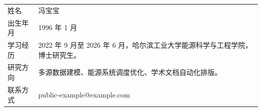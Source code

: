 \begin{tabularx}{\textwidth}{@{}lX@{}}
姓名 & 冯宝宝\\
出生年月 & 1996 年 1 月\\
学习经历 & 2022 年 9 月至 2026 年 6 月，哈尔滨工业大学能源科学与工程学院，博士研究生。\\
研究方向 & 多源数据建模、能源系统调度优化、学术文档自动化排版。\\
联系方式 & public-example@example.com\\
\end{tabularx}
